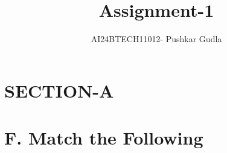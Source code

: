 \documentclass[journal,12pt,twocolumn]{IEEEtran}
\theoremstyle{remark}
\begin{document}

\vspace{3cm}

\title{\textbf{Assignment-1}}
\author{AI24BTECH11012- Pushkar Gudla}
\maketitle
\bigskip

\renewcommand{\thefigure}{\theenumi}
\renewcommand{\thetable}{\theenumi}
\onecolumn
\setlength{\columnsep}{2.5em}
\section*{\textbf{SECTION-A}}
\section*{\textbf{F.}  Match the Following}
\end{document}
